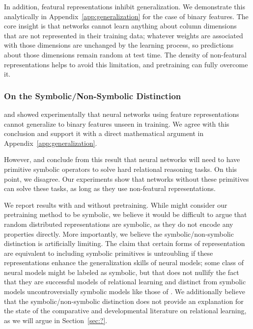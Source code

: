 \documentclass{article}
\newcommand{\secref}[1]{Section~\ref{#1}}
\newcommand{\appref}[1]{Appendix~\ref{#1}}
\begin{document}
{In addition, featural representations inhibit generalization. We demonstrate this analytically in \appref{app:generalization} for the case of binary features. The core insight is that networks cannot learn anything about column dimensions that are not represented in their training data; whatever weights are associated with those dimensions are unchanged by the learning process, so predictions about those dimensions remain random at test time. The density of non-featural representations helps to avoid this limitation, and pretraining can fully overcome it.

\subsubsection{On the Symbolic/Non-Symbolic Distinction}

\cite{marcus:1999} and \cite{marcus:2001} showed experimentally that neural networks using feature representations cannot generalize to binary features unseen in training. We agree with this conclusion and support it with a direct mathematical argument in \appref{app:generalization}.

However, \citeauthor{marcus:1999} and \citeauthor{marcus:2001} conclude from this result that neural networks will need to have primitive symbolic operators to solve hard relational reasoning tasks. On this point, we disagree. Our experiments show that networks without these primitives can solve these tasks, as long as they use non-featural representations.

We report results with and without pretraining. While \citeauthor{marcus:2001} might consider our pretraining method to be symbolic, we believe it would be difficult to argue that random distributed representations are symbolic, as they do not encode any properties directly. More importantly, we believe the symbolic/non-symbolic distinction is artificially limiting. The claim that certain forms of representation are equivalent to including symbolic primitives is untroubling if these representations enhance the generalization skills of neural models; some class of neural models might be labeled as symbolic, but that does not nullify the fact that they are successful models of relational learning and distinct from symbolic models uncontroversially symbolic models like those of \citealt{frank:2011}. We additionally believe that the symbolic/non-symbolic distinction does not provide an explanation for the state of the comparative and developmental literature on relational learning, as we will argue in \secref{sec:?}.}
\end{document}
